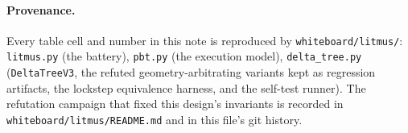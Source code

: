\documentclass[11pt]{article}
\begin{document}
\paragraph{Provenance.} Every table cell and number in this note is
reproduced by \texttt{whiteboard/litmus/}: \texttt{litmus.py} (the
battery), \texttt{pbt.py} (the execution model), \texttt{delta\_tree.py}
(\texttt{DeltaTreeV3}, the refuted geometry-arbitrating variants kept as
regression artifacts, the lockstep equivalence harness, and the self-test
runner). The refutation campaign that fixed this design's invariants is
recorded in \texttt{whiteboard/litmus/README.md} and in this file's git
history.
\end{document}
